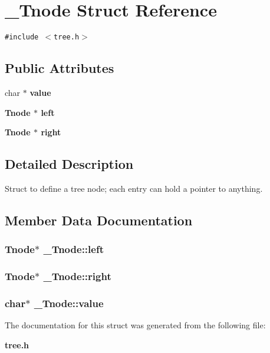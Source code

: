 \section{\_\-Tnode Struct Reference}
\label{struct__Tnode}
{\tt \#include $<$tree.h$>$}

\subsection*{Public Attributes}
\begin{CompactItemize}
\item 
char $\ast$ \bf{value}
\item 
\bf{Tnode} $\ast$ \bf{left}
\item 
\bf{Tnode} $\ast$ \bf{right}
\end{CompactItemize}


\subsection{Detailed Description}
Struct to define a tree node; each entry can hold a pointer to anything. 



\subsection{Member Data Documentation}
\subsubsection{\setlength{\rightskip}{0pt plus 5cm}\bf{Tnode}$\ast$ \bf{\_\-Tnode::left}}\label{struct__Tnode_12bcafafc68cd60dec0ba315d594fdbc}


\subsubsection{\setlength{\rightskip}{0pt plus 5cm}\bf{Tnode}$\ast$ \bf{\_\-Tnode::right}}\label{struct__Tnode_a4b766e5769ae49f3a2da8ae04648dc1}


\subsubsection{\setlength{\rightskip}{0pt plus 5cm}char$\ast$ \bf{\_\-Tnode::value}}\label{struct__Tnode_374c5893b3e5c8ca5226bbe371b2343c}




The documentation for this struct was generated from the following file:\begin{CompactItemize}
\item 
\bf{tree.h}\end{CompactItemize}
